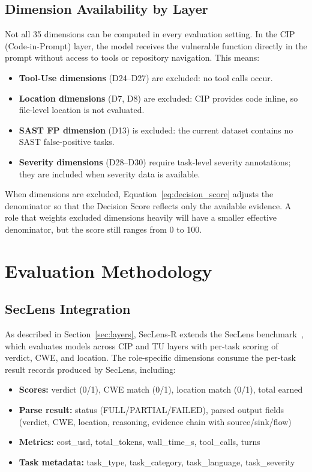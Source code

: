 \documentclass[10pt,twocolumn]{article}
\newcommand{\framework}{SecLens-R\xspace}
\newcommand{\seclens}{SecLens\xspace}
\begin{document}
\subsection{Dimension Availability by Layer}

Not all 35 dimensions can be computed in every evaluation setting. In the CIP (Code-in-Prompt) layer, the model receives the vulnerable function directly in the prompt without access to tools or repository navigation. This means:

\begin{itemize}[noitemsep,topsep=2pt]
    \item \textbf{Tool-Use dimensions} (D24--D27) are excluded: no tool calls occur.
    \item \textbf{Location dimensions} (D7, D8) are excluded: CIP provides code inline, so file-level location is not evaluated.
    \item \textbf{SAST FP dimension} (D13) is excluded: the current dataset contains no SAST false-positive tasks.
    \item \textbf{Severity dimensions} (D28--D30) require task-level severity annotations; they are included when severity data is available.
\end{itemize}

When dimensions are excluded, Equation~\ref{eq:decision_score} adjusts the denominator so that the Decision Score reflects only the available evidence. A role that weights excluded dimensions heavily will have a smaller effective denominator, but the score still ranges from 0 to 100.

\section{Evaluation Methodology}
\label{sec:methodology}

\subsection{SecLens Integration}
\label{sec:integration}

As described in Section~\ref{sec:layers}, \framework extends the \seclens benchmark~\citep{halder2026seclens}, which evaluates models across CIP and TU layers with per-task scoring of verdict, CWE, and location. The role-specific dimensions consume the per-task result records produced by \seclens, including:
\begin{itemize}[noitemsep,topsep=2pt]
    \item \textbf{Scores:} verdict (0/1), CWE match (0/1), location match (0/1), total earned
    \item \textbf{Parse result:} status (FULL/PARTIAL/FAILED), parsed output fields (verdict, CWE, location, reasoning, evidence chain with source/sink/flow)
    \item \textbf{Metrics:} cost\_usd, total\_tokens, wall\_time\_s, tool\_calls, turns
    \item \textbf{Task metadata:} task\_type, task\_category, task\_language, task\_severity
\end{itemize}
\end{document}
